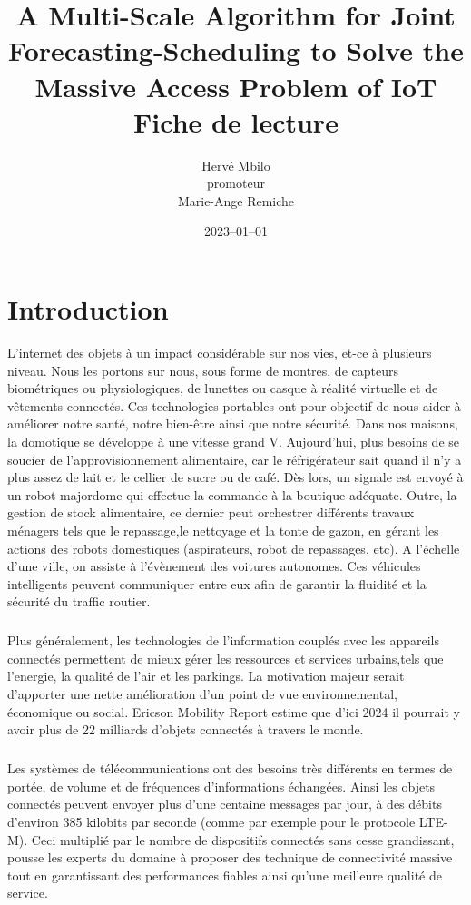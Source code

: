 \documentclass[12pt]{article}
\title{%
A Multi-Scale Algorithm for Joint
Forecasting-Scheduling to Solve the Massive
Access Problem of IoT
\bigskip \\
\large Fiche de lecture}
\author{Hervé Mbilo \smallskip \\ promoteur \vspace{0.0em} \\ Marie-Ange Remiche}
\date{2023–01–01}
\begin{document}
\maketitle

\section{Introduction}

L'internet des objets à un impact considérable sur nos vies, et-ce à plusieurs niveau.
Nous les portons sur nous, sous forme de montres, de capteurs biométriques ou physiologiques,
de lunettes ou casque à réalité virtuelle et de vêtements connectés. Ces technologies portables 
ont pour objectif de nous aider à améliorer notre santé, notre bien-être ainsi que notre sécurité.
Dans nos maisons, la domotique se développe à une vitesse grand V. Aujourd'hui, plus besoins de se soucier de l'approvisionnement alimentaire, car le réfrigérateur
sait quand il n'y a plus assez de lait et le cellier de sucre ou de café. Dès lors, un signale est envoyé à un robot majordome qui effectue 
la commande à la boutique adéquate. Outre, la gestion de stock alimentaire, ce dernier peut orchestrer différents travaux ménagers tels que le repassage,le nettoyage et la tonte de gazon,
en gérant les actions des robots domestiques (aspirateurs, robot de repassages, etc).
A l'échelle d'une ville, on assiste à l'évènement des voitures autonomes. Ces véhicules intelligents peuvent communiquer entre eux afin de garantir
la fluidité et la sécurité du traffic routier. 
\subparagraph{}Plus généralement, les technologies de l'information couplés 
avec les appareils connectés permettent de mieux gérer les ressources et services urbains,tels que l'energie, la qualité de l'air et les parkings.
La motivation majeur serait d'apporter une nette amélioration d'un point de vue environnemental, économique ou social.
Ericson Mobility Report estime que d'ici 2024 il pourrait y avoir plus de 22 milliards d'objets connectés à travers le monde.
\subparagraph{} Les systèmes de télécommunications ont des besoins très différents en termes de portée, de volume et de fréquences d'informations échangées. 
Ainsi les objets connectés peuvent envoyer plus d'une centaine messages par jour, à des débits d'environ 385 kilobits par seconde (comme par exemple pour le protocole LTE-M).
Ceci multiplié par le nombre de dispositifs connectés sans cesse grandissant, pousse les experts du domaine à proposer des technique de connectivité massive tout en garantissant des performances fiables ainsi qu'une meilleure qualité de service.
\end{document}
